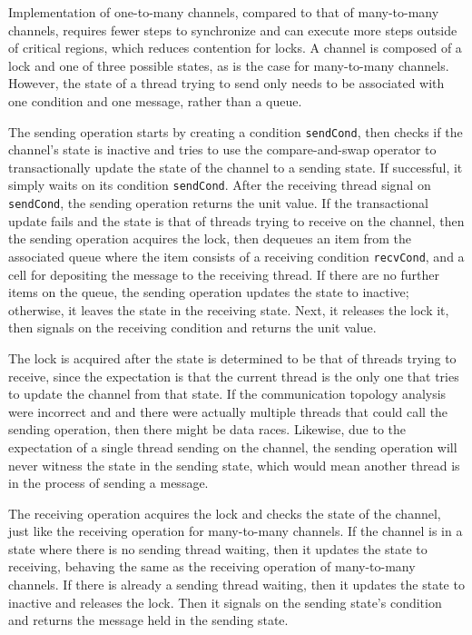 \documentclass[10pt]{article}
\begin{document}
Implementation of one-to-many channels, compared to that of many-to-many channels,
requires fewer
steps to synchronize and can execute more steps outside of critical regions, which reduces
contention for locks. A channel is composed of a lock and one of three possible states, as is
the case for many-to-many channels.  However, the state of a thread trying to send only needs
to be associated with one condition and one message, rather than a queue.  

The sending operation starts by creating a condition \lstinline{sendCond}, then checks
if the channel's state is inactive and tries to use the
compare-and-swap operator to transactionally update the state of
the channel to a sending state.
If successful, it simply waits on its condition \lstinline{sendCond}.
After the receiving thread signal on \lstinline{sendCond}, the sending operation returns the unit value.
If the transactional update fails and the state is
that of threads trying to receive on the channel, then the sending operation acquires the lock,
then dequeues an item from the associated queue where the item consists of a receiving condition \lstinline{recvCond},
and a cell for depositing the message to the receiving thread.
If there are no further items on the queue, the sending operation updates the state to inactive; otherwise, it
leaves the state in the receiving state.
Next, it releases the lock it, then signals on the receiving condition and returns the unit value.

The lock is acquired after the state is determined to be that of
threads trying to receive, since the expectation is that the current thread is the only one
that tries to update the channel from that state.  If the communication topology analysis were
incorrect and and there were actually multiple threads that could call the sending operation,
then there might be data races.  Likewise, due to the expectation of a single thread
sending on the channel, the sending operation will never witness the state in the sending state,
which would mean another thread is in the process of sending a message.

The receiving operation acquires the lock and checks
the state of the channel, just like the receiving operation for many-to-many channels.
If the channel is in a state where there is no sending thread waiting,
then it updates the state to receiving, behaving the same as the receiving operation of many-to-many channels.
If there is already a sending thread waiting, then it updates the state to inactive and
releases the lock. Then it signals on the sending state's condition and
returns the message held in the sending state.
\end{document}
